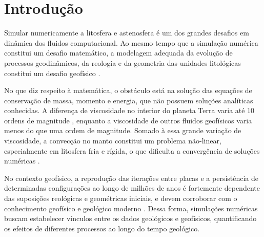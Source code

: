 \chapter{Introdução}
\label{introducao}

Simular numericamente a litosfera e astenosfera é um dos grandes desafios em dinâmica dos fluidos computacional. Ao mesmo tempo que a simulação numérica constitui um desafio matemático, a modelagem adequada da evolução de processos geodinâmicos, da reologia e da geometria das unidades litológicas constitui um desafio geofísico \citep{ranalli1995rheology,gerya2014precambrian}. 

No que diz respeito à matemática, o obstáculo está na solução das equações de conservação de massa, momento e energia, que não possuem soluções analíticas conhecidas. A diferença de viscosidade no interior do planeta Terra varia até 10 ordens de magnitude \citep[de $10^{16}$ à $10^{26}$ Pa s,][]{gerya-geodynamic-modelling}, enquanto a viscosidade de outros fluidos geofísicos varia menos do que uma ordem de magnitude. Somado à essa grande variação de viscosidade, a convecção no manto constitui um problema não-linear, especialmente em litosfera fria e rígida, o que dificulta a convergência de soluções numéricas \citep{gerya-geodynamic-modelling,zhong2015treatise}. 



No contexto geofísico, a reprodução das iterações entre placas e a persistência de determinadas configurações ao longo de milhões de anos é fortemente dependente das suposições reológicas e geométricas iniciais, e devem corroborar com o conhecimento geofísico e geológico moderno \citep{schellart2007evolution,vanhunen2002}. Dessa forma, simulações numéricas buscam estabelecer vínculos entre os dados geológicos e geofísicos, quantificando os efeitos de diferentes processos ao longo do tempo geológico.


